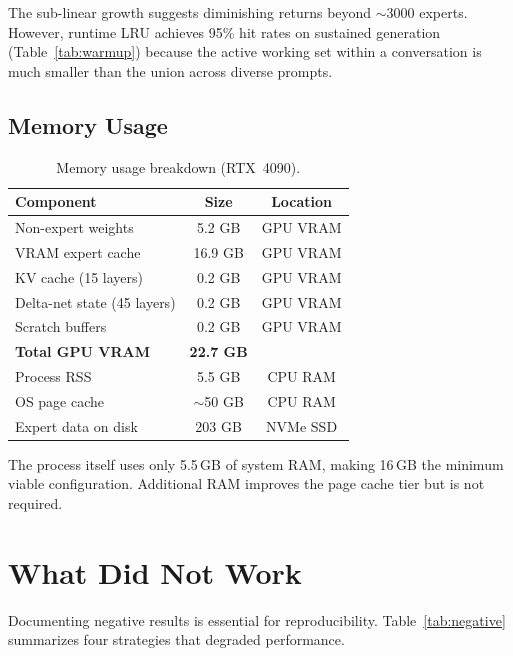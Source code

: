 \documentclass[11pt]{article}
\begin{document}
The sub-linear growth suggests diminishing returns beyond $\sim$3000 experts. However, runtime LRU achieves 95\% hit rates on sustained generation (Table~\ref{tab:warmup}) because the active working set within a conversation is much smaller than the union across diverse prompts.

\subsection{Memory Usage}

\begin{table}[h]
\centering
\small
\caption{Memory usage breakdown (RTX~4090).}
\label{tab:memory}
\begin{tabular}{lcc}
\toprule
\textbf{Component} & \textbf{Size} & \textbf{Location} \\
\midrule
Non-expert weights & 5.2 GB & GPU VRAM \\
VRAM expert cache & 16.9 GB & GPU VRAM \\
KV cache (15 layers) & 0.2 GB & GPU VRAM \\
Delta-net state (45 layers) & 0.2 GB & GPU VRAM \\
Scratch buffers & 0.2 GB & GPU VRAM \\
\midrule
\textbf{Total GPU VRAM} & \textbf{22.7 GB} & \\
\midrule
Process RSS & 5.5 GB & CPU RAM \\
OS page cache & $\sim$50 GB & CPU RAM \\
Expert data on disk & 203 GB & NVMe SSD \\
\bottomrule
\end{tabular}
\end{table}

The process itself uses only 5.5\,GB of system RAM, making 16\,GB the minimum viable configuration. Additional RAM improves the page cache tier but is not required.

\section{What Did Not Work}

Documenting negative results is essential for reproducibility. Table~\ref{tab:negative} summarizes four strategies that degraded performance.
\end{document}
